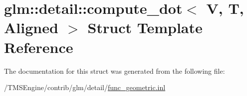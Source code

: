 \hypertarget{structglm_1_1detail_1_1compute__dot}{}\section{glm\+:\+:detail\+:\+:compute\+\_\+dot$<$ V, T, Aligned $>$ Struct Template Reference}
\label{structglm_1_1detail_1_1compute__dot}


The documentation for this struct was generated from the following file\+:\begin{DoxyCompactItemize}
\item 
/\+T\+M\+S\+Engine/contrib/glm/detail/\hyperlink{func__geometric_8inl}{func\+\_\+geometric.\+inl}\end{DoxyCompactItemize}
